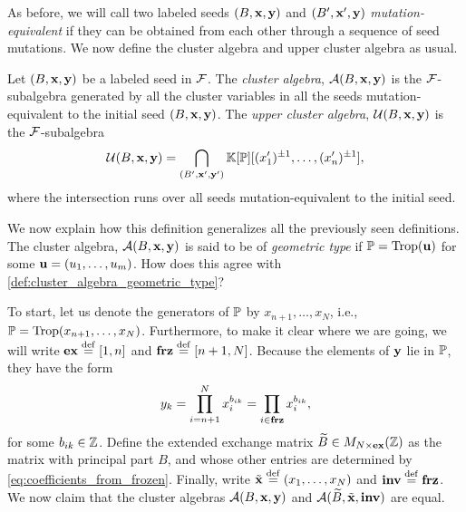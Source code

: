 As before, we will call two labeled seeds $(B, \mathbf{x}, \mathbf{y})$ and $(B', \mathbf{x}', \mathbf{y})$
\emph{mutation-equivalent} if they can be obtained from each
other through a sequence of seed mutations. We now define the cluster algebra and upper
cluster algebra as usual.
\begin{definition}

	Let $(B, \mathbf{x}, \mathbf{y})$ be a labeled seed in $\mathcal{F}$. The \emph{cluster
		algebra}, $\mathcal{A}(B,
		\mathbf{x}, \mathbf{y})$ is the $\mathcal{F}$-subalgebra generated by all
	the cluster variables in all the seeds mutation-equivalent to the initial seed $(B,
		\mathbf{x}, \mathbf{y})$. The \emph{upper cluster algebra}, $\mathcal{U}(B, \mathbf{x}, \mathbf{y})$ is the $\mathcal{F}$-subalgebra
	\begin{equation*}
		\mathcal{U}(B, \mathbf{x}, \mathbf{y}) = \bigcap_{(B', \mathbf{x}', \mathbf{y}')} \mathbb{K}[\mathbb{P}][(x_1')^{\pm 1}, \dots, (x'_n)^{\pm 1}],
	\end{equation*}
	where the intersection runs over all seeds mutation-equivalent to the initial seed.
\end{definition}

We now explain how this definition generalizes all the previously seen definitions. The
cluster algebra, $\mathcal{A}(B, \mathbf{x}, \mathbf{y})$ is said to be of \emph{geometric
	type} if $\mathbb{P} = \operatorname{Trop}(\mathbf{u})$ for some $\mathbf{u} =
	(u_1, \dots, u_m)$. How does this agree with \cref{def:cluster_algebra_geometric_type}? 

To start, let us denote the generators of $\mathbb{P}$ by $x_{n+1}, \dots, x_N$, i.e., $\mathbb{P}
	= \operatorname{Trop}(x_{n+1}, \dots, x_N)$. Furthermore, to make it clear where we are going, we
will write $\mathbf{ex} \overset{\mathrm{def}}{=} [1, n]$ and $\mathbf{frz} \overset{\mathrm{def}}{=} [n+1, N]$. Because the elements of
$\mathbf{y}$ lie in $\mathbb{P}$, they have the form
\begin{equation}\label{eq:coefficients_from_frozen}
	y_k = \prod_{i = n+1}^N x_i^{b_{ik}} = \prod_{i \in \mathbf{frz}} x_i^{b_{ik}},
\end{equation}
%
for some $b_{ik} \in \mathbb{Z}$. Define the extended exchange matrix $\widetilde{B} \in M_{N \times
			\mathbf{ex}}(\mathbb{Z})$ as the matrix with principal part $B$, and whose other entries are
determined by \cref{eq:coefficients_from_frozen}. Finally, write $\tilde{\mathbf{x}} \overset{\mathrm{def}}{=} (x_1,
	\dots, x_N)$ and $\mathbf{inv} \overset{\mathrm{def}}{=} \mathbf{frz}$. We now claim that the cluster algebras $\mathcal{A}(B,
	\mathbf{x}, \mathbf{y})$ and $\mathcal{A}(\widetilde{B}, \tilde{\mathbf{x}}, \mathbf{inv})$ are equal.

